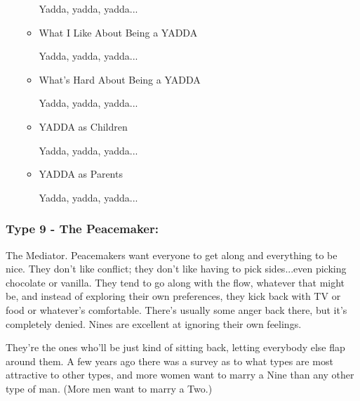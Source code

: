 \documentclass[openleft,oneside,showtrims]{memoir}
\begin{document}
\begin{itemize}
\begin{itemize}
Yadda, yadda, yadda...

\item What I Like About Being a YADDA
\label{sec:orgb40fe09}

Yadda, yadda, yadda...

\item What's Hard About Being a YADDA
\label{sec:orga9873e9}

Yadda, yadda, yadda...

\item YADDA as Children
\label{sec:org08fa2c1}

Yadda, yadda, yadda...

\item YADDA as Parents
\label{sec:orgd04055f}

Yadda, yadda, yadda...
\end{itemize}
\end{itemize}

\subsubsection*{Type 9 - The Peacemaker:}
\label{sec:orgb640c46}

The Mediator.  Peacemakers want everyone to get along and everything to be nice. They don't like conflict; they don't like having to pick sides...even picking chocolate or vanilla. They tend to go along with the flow, whatever that might be, and instead of exploring their own preferences, they kick back with TV or food or whatever's comfortable. There's usually some anger back there, but it's completely denied. Nines are excellent at ignoring their own feelings.

They're the ones who'll be just kind of sitting back, letting everybody else flap around them. A few years ago there was a survey as to what types are most attractive to other types, and more women want to marry a Nine than any other type of man. (More men want to marry a Two.)
\end{document}
